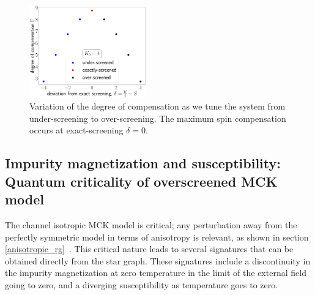 \documentclass[reprint,prb,superscriptaddress]{revtex4-2}
\begin{document}
\begin{figure}[!htpb]
	\centering
	\includegraphics[width=0.45\textwidth]{../numerics/deg_of_comp.pdf}
	\caption{Variation of the degree of compensation as we tune the system from under-screening to over-screening. The maximum spin compensation occurs at exact-screening \(\delta=0\).}
\end{figure}

\subsection{Impurity magnetization and susceptibility: Quantum criticality of overscreened MCK model}
The channel isotropic MCK model is critical; any perturbation away from the perfectly symmetric model in terms of anisotropy is relevant, as shown in section \ref{anisotropic_rg}~\cite{vojta_2006,andrew_bulla_2011,pang_cox_1991}. This critical nature leads to several signatures that can be obtained directly from the star graph. These signatures include a discontinuity in the impurity magnetization at zero temperature in the limit of the external field going to zero, and a diverging susceptibility as temperature goes to zero.
\end{document}
